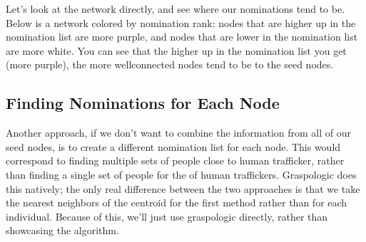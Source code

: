 \documentclass[letterpaper,10pt,english]{jupyterBook}
\begin{document}
\begin{sphinxVerbatim}[commandchars=\\\{\}]
   

  
   \PYG{p}{[} \PYG{p}{]}
\end{sphinxVerbatim}

\noindent{}

\sphinxAtStartPar
Let’s look at the network directly, and see where our nominations tend to be. Below is a network colored by nomination rank: nodes that are higher up in the nomination list are more purple, and nodes that are lower in the nomination list are more white. You can see that the higher up in the nomination list you get (more purple), the more well\sphinxhyphen{}connected nodes tend to be to the seed nodes.

\noindent{}


\subsection{Finding Nominations for Each Node}
\label{\detokenize{applications/ch8/single-vertex-nomination:finding-nominations-for-each-node}}
\sphinxAtStartPar
Another approach, if we don’t want to combine the information from all of our seed nodes, is to create a different nomination list for each node. This would correspond to finding multiple sets of people close to  human trafficker, rather than finding a single set of people for the  of human traffickers. Graspologic does this natively; the only real difference between the two approaches is that we take the nearest neighbors of the centroid for the first method rather than for each individual. Because of this, we’ll just use graspologic directly, rather than showcasing the algorithm.
\end{document}
